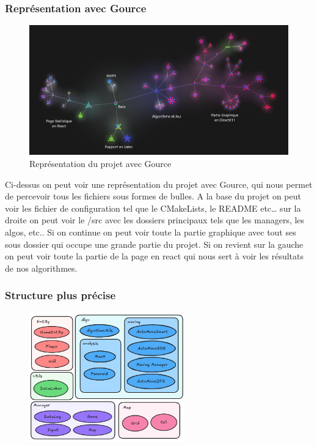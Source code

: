 \subsubsection{Représentation avec Gource}
\begin{figure}[h]
	\centering
	\includegraphics[width=1.0\textwidth]{images/GourceScreenFinal.png}
	\caption{Représentation du projet avec Gource}
	\label{GourceScreen}
\end{figure}
Ci-dessus on peut voir une représentation du projet avec Gource, qui nous permet de percevoir tous les fichiers sous formes de bulles. A la base du projet on peut voir les fichier de configuration tel que le CMakeLists, le README etc… sur la droite on peut voir le /src avec les dossiers principaux tels que les managers, les algos, etc.. Si on continue on peut voir toute la partie graphique avec tout ses sous dossier qui occupe une grande partie du projet. Si on revient sur la gauche on peut voir toute la partie de la page en react qui nous sert à voir les résultats de nos algorithmes.

\newpage

\subsubsection{Structure plus précise}
\begin{figure}
	\centering
	\includegraphics[width=0.6\textwidth]{images/ExcalidrawBase.png}
\end{figure}


